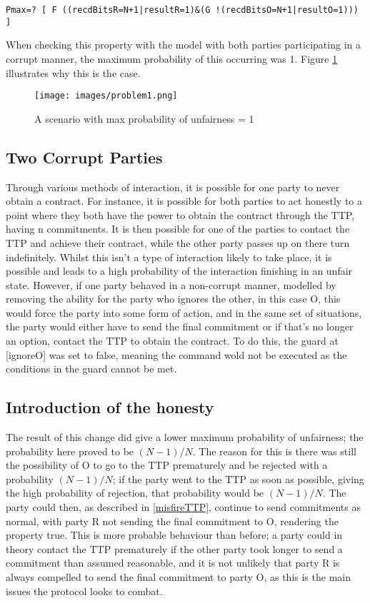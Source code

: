\documentclass{l4proj}
\begin{document}
\begin{lstlisting}
Pmax=? [ F ((recdBitsR=N+1|resultR=1)&(G !(recdBitsO=N+1|resultO=1))) ]
\end{lstlisting}

When checking this property with the model with both parties participating in a corrupt manner, the maximum probability of this occurring was 1. Figure \ref{problem1} illustrates why this is the case.

\begin{figure}[ht!]
\centering
\texttt{[image: images/problem1.png]}
\caption{A scenario with max probability of unfairness = 1}
\label{problem1}
\end{figure}

\subsection{Two Corrupt Parties}

Through various methods of interaction, it is possible for one party to never obtain a contract. For instance, it is possible for both parties to act honestly to a point where they both have the power to obtain the contract through the TTP, having n commitments. It is then possible for one of the parties to contact the TTP and achieve their contract, while the other party passes up on there turn indefinitely. Whilst this isn't a type of interaction likely to take place, it is possible and leads to a high probability of the interaction finishing in an unfair state. However, if one party behaved in a non-corrupt manner, modelled by removing the ability for the party who ignores the other, in this case O, this would force the party into some form of action, and in the same set of situations, the party would either have to send the final commitment or if that's no longer an option, contact the TTP to obtain the contract. To do this, the guard at [ignoreO] was set to false, meaning the command wold not be executed as the conditions in the guard cannot be met.

\subsection{Introduction of the honesty}

The result of this change did give a lower maximum probability of unfairness; the probability here proved to be $(N-1)/N$. The reason for this is there was still the possibility of O to go to the TTP prematurely and be rejected with a probability $(N-1)/N$; if the party went to the TTP as soon as possible, giving the high probability of rejection, that probability would be $(N-1)/N$. The party could then, as described in \ref{misfireTTP}, continue to send commitments as normal, with party R not sending the final commitment to O, rendering the property true. This is more probable behaviour than before; a party could in theory contact the TTP prematurely if the other party took longer to send a commitment than assumed reasonable, and it is not unlikely that party R is always compelled to send the final commitment to party O, as this is the main issues the protocol looks to combat. 
\end{document}

